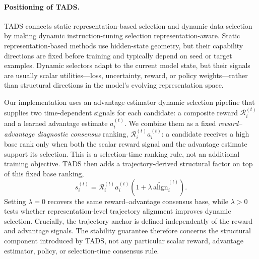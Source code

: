 \paragraph{Positioning of \textsc{TADS}.}
\textsc{TADS} connects static representation-based selection and
dynamic data selection by making dynamic instruction-tuning
selection representation-aware. Static representation-based methods
use hidden-state geometry, but their capability directions are fixed
before training and typically depend on seed or target examples.
Dynamic selectors adapt to the current model state, but their
signals are usually scalar utilities---loss, uncertainty, reward, or
policy weights---rather than structural directions in the model's
evolving representation space.

Our implementation uses an advantage-estimator dynamic selection pipeline
that supplies two time-dependent signals for each candidate: a
composite reward $\mathcal{R}_i^{(t)}$ and a learned advantage estimate
$a_i^{(t)}$. We combine them as a fixed
\emph{reward--advantage diagnostic consensus} ranking,
$\mathcal{R}_i^{(t)}a_i^{(t)}$: a candidate receives a high base
rank only when both the scalar reward signal and the advantage estimate
support its selection. This is a selection-time ranking rule, not an
additional training objective. \textsc{TADS} then adds a
trajectory-derived structural factor on top of this fixed base
ranking,
\[
s_i^{(t)}
=
\mathcal{R}_i^{(t)}a_i^{(t)}
\left(
1+\lambda\,\widetilde{\mathrm{align}}_i^{(t)}
\right).
\]
Setting $\lambda=0$ recovers the same reward--advantage consensus base,
while $\lambda>0$ tests whether representation-level trajectory
alignment improves dynamic selection. Crucially, the trajectory
anchor is defined independently of the reward and advantage signals.
The stability guarantee therefore concerns the structural component
introduced by \textsc{TADS}, not any particular scalar reward, advantage estimator,
policy, or selection-time consensus rule.
